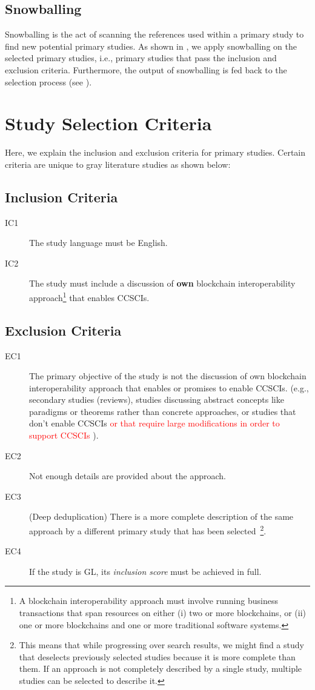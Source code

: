 \documentclass[review]{elsarticle}
\begin{document}
\subsection{Snowballing}
Snowballing is the act of scanning the references used within a primary study to find new potential primary studies.
As shown in , we apply snowballing on the selected primary studies, i.e., primary studies that pass the inclusion and exclusion criteria.
Furthermore, the output of snowballing is fed back to the selection process (see ).

\section{Study Selection Criteria}
\label{sec:study-selection-criteria}
Here, we explain the inclusion and exclusion criteria for primary studies.
Certain criteria are unique to gray literature studies as shown below:

\subsection{Inclusion Criteria}
\begin{description}
	\item[IC1] The study language must be English.
	\item[IC2] The study must include a discussion of \textbf{own} blockchain interoperability approach\footnote{A blockchain interoperability approach must involve running business transactions that span resources on either (i) two or more blockchains, or (ii) one or more blockchains and one or more traditional software systems.} that enables CCSCIs.
\end{description}

\subsection{Exclusion Criteria}
\begin{description}
	\item[EC1] The primary objective of the study is not the discussion of own blockchain interoperability approach that enables or promises to enable CCSCIs. (e.g., secondary studies (reviews), studies discussing abstract concepts like paradigms or theorems rather than concrete approaches, or studies that don't enable CCSCIs \textcolor{red}{or that require large modifications in order to support CCSCIs} ).
	\item[EC2] Not enough details are provided about the approach.
	\item[EC3] (Deep deduplication) There is a more complete description of the same approach by a different primary study that has been selected~\footnote{This means that while progressing over search results, we might find a study that deselects previously selected studies because it is more complete than them. If an approach is not completely described by a single study, multiple studies can be selected to describe it.}.
	\item[EC4] If the study is GL, its \textit{inclusion score} must be achieved in full.
\end{description}
\end{document}

